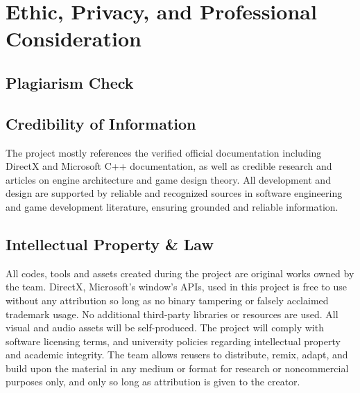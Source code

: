 \section{Ethic, Privacy, and Professional Consideration}
\label{sec:ethic-privacy-and-professional-consideration}

\subsection{Plagiarism Check}
\label{subsec:plagiarism-check}

\subsection{Credibility of Information}
\label{subsec:credibility-of-information}

The project mostly references the verified official documentation including DirectX and Microsoft C++ documentation,
as well as credible research and articles on engine architecture and game design theory.
All development and design are supported by reliable and recognized sources in software engineering and game development literature,
ensuring grounded and reliable information.

\subsection{Intellectual Property \& Law}
\label{subsec:intellectual-property-and-law}

All codes, tools and assets created during the project are original works owned by the team.
DirectX, Microsoft's window’s APIs, used in this project is free to use without any attribution so long as no binary tampering or falsely acclaimed trademark usage.
No additional third-party libraries or resources are used.
All visual and audio assets will be self-produced.
The project will comply with software licensing terms, and university policies regarding intellectual property and academic integrity.
The team allows reusers to distribute, remix, adapt, and build upon the material in any medium or format for research or noncommercial purposes only,
and only so long as attribution is given to the creator.

\label{tag:end}